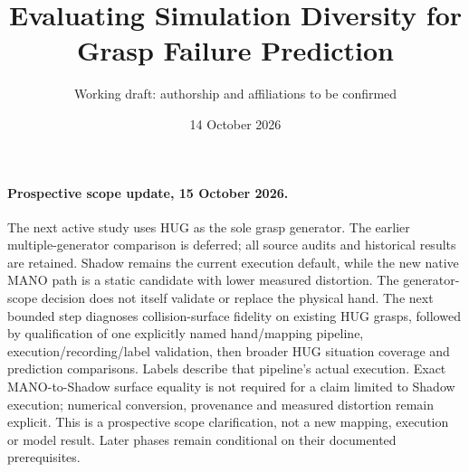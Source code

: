\documentclass[10pt,letterpaper]{article}
\title{Evaluating Simulation Diversity for Grasp Failure Prediction}
\author{Working draft: authorship and affiliations to be confirmed}
\date{14 October 2026}
\begin{document}
\maketitle


\paragraph{Prospective scope update, 15 October 2026.}
The next active study uses HUG as the sole grasp generator. The earlier
multiple-generator comparison is deferred; all source audits and historical
results are retained. Shadow remains the current execution default, while the
new native MANO path is a static candidate with lower measured distortion.
The generator-scope decision does not itself validate or replace the physical
hand. The next bounded step diagnoses collision-surface fidelity on existing
HUG grasps, followed by qualification of one explicitly named hand/mapping
pipeline, execution/recording/label validation, then broader HUG situation
coverage and prediction comparisons. Labels describe that pipeline's actual
execution. Exact MANO-to-Shadow surface equality is not required for a claim
limited to Shadow execution; numerical conversion, provenance and measured
distortion remain explicit. This is a prospective scope clarification, not a
new mapping, execution or model result. Later phases remain conditional on
their documented prerequisites.
\end{document}
